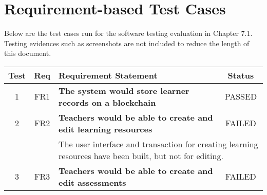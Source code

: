 
\chapter{Requirement-based Test Cases}

Below are the test cases run for the software testing evaluation in Chapter 7.1.
Testing evidences such as screenshots are not included to reduce the length of this document.

\begin{table}[!ht]
	\begin{tabularx}{\textwidth}{|c|c|X|c|}
		\hline
		Test                                                              & Req                     & Requirement Statement                                                                                                                                 & Status                  \\
		\hline
		1                                                                 & FR1                     & \textbf{The system would store learner records on a blockchain}                                                                                       & \cellcolor{green}PASSED \\
		\hline
		2                                                                 & FR2                     & \textbf{Teachers would be able to create and edit learning resources}                                                                                 & \cellcolor{pink}FAILED  \\
		\hline
		                                                                  &                         & \multicolumn{2}{X|}{The user interface and transaction for creating learning resources have been built,
			but not for editing.}                                                                                                                                                                                                                                                         \\
		\hline
		3                                                                 & FR3                     & \textbf{Teachers would be able to create and edit assessments}                                                                                        & \cellcolor{pink}FAILED  \\

\end{tabularx}
\end{table}
